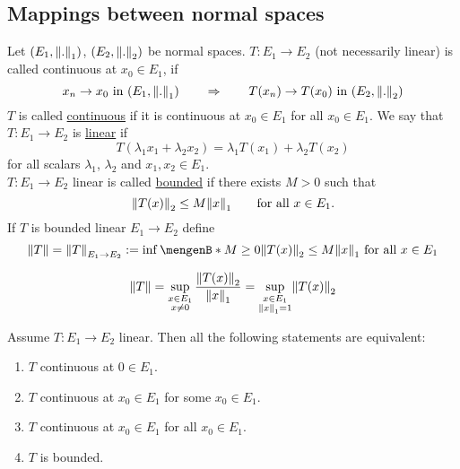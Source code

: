 \subsection{Mappings between normal spaces} 
\label{sub:mappings_between_normal_spaces}
\begin{definition*}
	Let $(E_1,\norm{.}_1)$, $(E_2,\norm{.}_2)$ be normal spaces. $T: E_1 \to E_2$ (not necessarily linear) is called continuous at $x_0 \in E_1$, if 
	\[
		x_n \to x_0 \text{ in } (E_1,\norm{.}_1) \qquad \Rightarrow \qquad T(x_n) \to T(x_0) \text{ in } (E_2,\norm{.}_2)
	\]
	$T$ is called \underline{continuous} if it is continuous at $x_0 \in E_1$ for all $x_0 \in E_1$. We say that $T: E_1 \to E_2$ is \underline{linear} if 
	\[
		T(\lambda_1 x_1 + \lambda_2 x_2) = \lambda_1 T(x_1) + \lambda_2 T(x_2)
	\]
	for all scalars $\lambda_1$, $\lambda_2$ and $x_1,x_2 \in E_1$. \\
	$T: E_1 \to E_2$ linear is called \underline{bounded} if there exists $M>0$ such that
	\[
		\norm{T(x)}_2 \leq M \norm{x}_1 \qquad \text{for all }x \in E_1.
	\]If $T$ is bounded linear $E_1 \to E_2$ define
	\[
		\norm{T} = \norm{T}_{E_1 \to E_2} := \inf \set[M \geq 0]{\norm{T(x)}_2 \leq M \norm{x}_1 \text{ for all }x \in E_1}
	\]
\end{definition*}
\begin{lemma*}
	\[
		\norm{T} = \sup\limits_{\substack{x \in E_1 \\ x \neq 0}} \frac{\norm{T(x)}_2}{\norm{x}_1} = \sup\limits_{\substack{x \in E_1 \\ \norm{x}_1=1}} \norm{T(x)}_2
	\]
\end{lemma*}
\begin{proposition*}
	Assume $T: E_1 \to E_2$ linear. Then all the following statements are equivalent:
	\begin{enumerate}[(1)]
		\item $T$ continuous at $0 \in E_1$.
		\item $T$ continuous at $x_0 \in E_1$ for some $x_0 \in E_1$.
		\item $T$ continuous at $x_0 \in E_1$ for all $x_0 \in E_1$.
		\item $T$ is bounded.
	\end{enumerate}
\end{proposition*}
